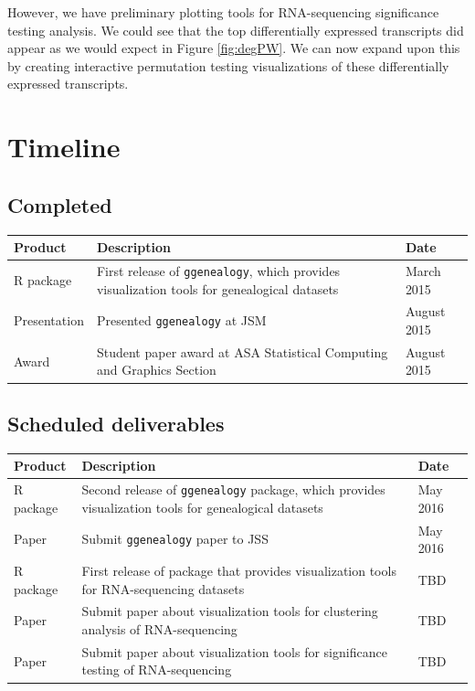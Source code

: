 \documentclass[11pt,a4paper,oldfontcommands,openany]{memoir}
\numberwithin{equation}{section} %
\newcommand{\pkg}[1]{{\texttt{#1}}}
\begin{document}
However, we have preliminary plotting tools for RNA-sequencing significance testing analysis. We could see that the top differentially expressed transcripts did appear as we would expect in Figure \ref{fig:degPW}. We can now expand upon this by creating interactive permutation testing visualizations of these differentially expressed transcripts.

\chapter{Timeline}
\label{sec:timeline}

\section{Completed}

\begin{tabular}{|p{3cm}|p{8cm}|p{3cm}|}
 \hline
 \textbf{Product} & \textbf{Description} & \textbf{Date} \\ 
 \hline
 R package & First release of \pkg{ggenealogy}, which provides visualization tools for genealogical datasets & March 2015 \\
 \hline
 Presentation & Presented \pkg{ggenealogy} at JSM & August 2015 \\
 \hline
 Award & Student paper award at ASA Statistical Computing and Graphics Section & August 2015 \\
 \hline
\end{tabular}

\section{Scheduled deliverables}

\begin{tabular}{|p{3cm}|p{8cm}|p{3cm}|}
 \hline
 \textbf{Product} & \textbf{Description} & \textbf{Date} \\ 
 \hline
 R package & Second release of \pkg{ggenealogy} package, which provides visualization tools for genealogical datasets & May 2016 \\
 \hline
 Paper & Submit \pkg{ggenealogy} paper to JSS & May 2016 \\
 \hline
 R package & First release of package that provides visualization tools for RNA-sequencing datasets & TBD \\
 \hline
 Paper & Submit paper about visualization tools for clustering analysis of RNA-sequencing & TBD \\
 \hline
 Paper & Submit paper about visualization tools for significance testing of RNA-sequencing & TBD \\
 \hline
\end{tabular}
\end{document}
